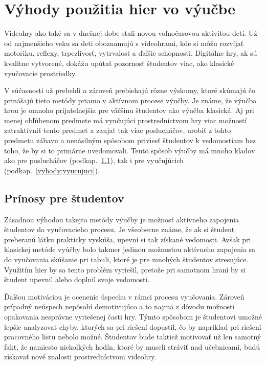\documentclass[10pt,twoside,slovak,a4paper]{article}
\begin{document}
\section{Výhody použitia hier vo výučbe} \label{vyhody}

Videohry ako také sa v dnešnej dobe stali novou voľnočasovou aktivitou detí. Už od najmenšieho veku sa deti oboznamujú s videohrami, kde si môžu rozvíjať motoriku, reflexy, trpezlivosť, vytrvalosť a ďalšie schopnosti. Digitálne hry, ak sú kvalitne vytvorené, dokážu upútať pozornosť študentov viac, ako klasické vyučovacie prostriedky. 

V súčasnosti už prebehli a zároveň prebiehajú rôzne výskumy, ktoré skúmajú čo prinášajú tieto metódy priamo v aktívnom procese výučby\cite{Chen2012-ao}. Je známe, že výučba hrou je omnoho prijateľnejšia pre väčšinu študentov ako výučba klasická. Aj pri menej obľúbenom predmete má vyučujúci prostredníctvom hry viac možností zatraktívniť tento predmet a zaujať tak viac poslucháčov, urobiť z tohto predmetu zábavu a nenásilným spôsobom priviesť študentov k vedomostiam bez toho, že by si to primárne uvedomovali. Tento spôsob výučby má mnoho kladov ako pre poslucháčov (podkap.~\ref{vyhody:studenti}), tak i pre vyučujúcich (podkap.~\ref{vyhody:vyucujuci}).

\subsection{Prínosy pre študentov} \label{vyhody:studenti}

Zásadnou výhodou takejto metódy výučby je možnosť aktívneho zapojenia študentov do vyučovacieho procesu. Je všeobecne známe, že ak si študent preberanú látku prakticky vyskúša, upevní si tak získané vedomosti. Avšak pri klasickej metóde vyúčby bolo takmer jedinou možnosťou aktívneho zapojenia sa do vyučovania skúšanie pri tabuli, ktoré je pre mnohých študentov stresujúce. Využitím hier by sa tento problém vyriešil, pretože pri samotnom hraní by si študent upevnil alebo doplnil svoje vedomosti.

 Ďalšou motiváciou je ocenenie úspechu v rámci procesu vyučovania. Zároveň prípadný neúspech nepôsobí demotivujúco a to najmä z dôvodu možnosti opakovania nesprávne vyriešenej časti hry. Týmto spôsobom je študentovi umožné lepšie analyzovať chyby, ktorých sa pri riešení dopustil, čo by napríklad pri riešení pracovného listu nebolo možné. Študentov bude taktiež motivovať už len samotný fakt, že namiesto niekoľkých hodín, ktoré by museli stráviť nad učebnicami, budú získavať nové znalosti prostredníctvom videohry\cite{7930309}. 
\end{document}
